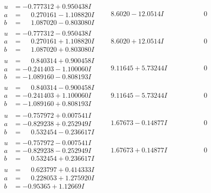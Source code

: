 \documentclass[1p]{elsarticle_modified}
\theoremstyle{definition}
\begin{document}
$$\begin{array}{c|c|c}
\begin{aligned}
u &= -0.777312 + 0.950438 I \\
a &= \phantom{-}0.270161 - 1.108820 I \\
b &= \phantom{-}1.087020 - 0.803080 I\end{aligned}
 & \phantom{-}8.6020 - 12.0514 I & \phantom{-0.000000 } 0 \\ \hline\begin{aligned}
u &= -0.777312 - 0.950438 I \\
a &= \phantom{-}0.270161 + 1.108820 I \\
b &= \phantom{-}1.087020 + 0.803080 I\end{aligned}
 & \phantom{-}8.6020 + 12.0514 I & \phantom{-0.000000 } 0 \\ \hline\begin{aligned}
u &= \phantom{-}0.840314 + 0.900458 I \\
a &= -0.241403 - 1.100060 I \\
b &= -1.089160 - 0.808193 I\end{aligned}
 & \phantom{-}9.11645 + 5.73244 I & \phantom{-0.000000 } 0 \\ \hline\begin{aligned}
u &= \phantom{-}0.840314 - 0.900458 I \\
a &= -0.241403 + 1.100060 I \\
b &= -1.089160 + 0.808193 I\end{aligned}
 & \phantom{-}9.11645 - 5.73244 I & \phantom{-0.000000 } 0 \\ \hline\begin{aligned}
u &= -0.757972 + 0.007541 I \\
a &= -0.829238 + 0.252949 I \\
b &= \phantom{-}0.532454 - 0.236617 I\end{aligned}
 & \phantom{-}1.67673 - 0.14877 I & \phantom{-0.000000 } 0 \\ \hline\begin{aligned}
u &= -0.757972 - 0.007541 I \\
a &= -0.829238 - 0.252949 I \\
b &= \phantom{-}0.532454 + 0.236617 I\end{aligned}
 & \phantom{-}1.67673 + 0.14877 I & \phantom{-0.000000 } 0 \\ \hline\begin{aligned}
u &= \phantom{-}0.623797 + 0.414333 I \\
a &= \phantom{-}0.228053 + 1.275920 I \\
b &= -0.95365 + 1.12669 I\end{aligned}

\end{array}$$
\end{document}
